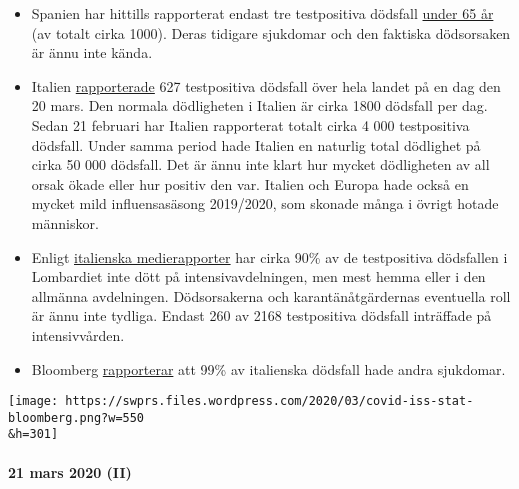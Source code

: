 \begin{itemize}
\tightlist
\item
  Spanien har hittills rapporterat endast tre testpositiva dödsfall
  \href{https://www.20minutos.es/noticia/4193883/0/media-edad-coronavirus-espana/}{under
  65 år} (av totalt cirka 1000). Deras tidigare sjukdomar och den
  faktiska dödsorsaken är ännu inte kända.
\item
  Italien
  \href{https://www.msn.com/en-au/news/coronavirus/italy-coronavirus-deaths-surge-by-627-in-a-day-lifting-total-death-toll-to-4032/ar-BB11tDnS}{rapporterade}
  627 testpositiva dödsfall över hela landet på en dag den 20 mars. Den
  normala dödligheten i Italien är cirka 1800 dödsfall per dag. Sedan 21
  februari har Italien rapporterat totalt cirka 4 000 testpositiva
  dödsfall. Under samma period hade Italien en naturlig total dödlighet
  på cirka 50 000 dödsfall. Det är ännu inte klart hur mycket
  dödligheten av all orsak ökade eller hur positiv den var. Italien och
  Europa hade också en mycket mild influensasäsong 2019/2020, som
  skonade många i övrigt hotade människor.
\item
  Enligt
  \href{https://www.tgcom24.mediaset.it/cronaca/coronavirus-in-lombardia-9-morti-su-10-mai-giunti-in-terapia-intensiva_16362350-202002a.shtml}{italienska
  medierapporter} har cirka 90\% av de testpositiva dödsfallen i
  Lombardiet inte dött på intensivavdelningen, men mest hemma eller i
  den allmänna avdelningen. Dödsorsakerna och karantänåtgärdernas
  eventuella roll är ännu inte tydliga. Endast 260 av 2168 testpositiva
  dödsfall inträffade på intensivvården.
\item
  Bloomberg
  \href{https://www.bloomberg.com/news/articles/2020-03-18/99-of-those-who-died-from-virus-had-other-illness-italy-says}{rapporterar}
  att 99\% av italienska dödsfall hade andra sjukdomar.
\end{itemize}

\texttt{[image: https://swprs.files.wordpress.com/2020/03/covid-iss-stat-bloomberg.png?w=550\\\&h=301]}

\hypertarget{21-mars-2020-ii}{%
\paragraph{21 mars 2020 (II)}\label{21-mars-2020-ii}}

